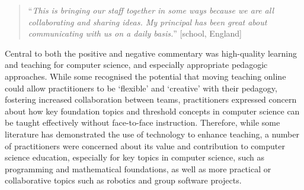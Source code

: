 \documentclass[conference]{IEEEtran}
\begin{document}

\begin{quotation}
``{\emph{This is bringing our staff together in some ways because we
are all collaborating and sharing ideas. My principal has been great
about communicating with us on a daily basis.}}'' [school, England]
\end{quotation}

Central to both the positive and negative commentary was high-quality
learning and teaching for computer science, and especially appropriate
pedagogic approaches. While some recognised the potential that moving
teaching online could allow practitioners to be `flexible' and
`creative' with their pedagogy, fostering increased collaboration between teams,
practitioners expressed concern about
how key foundation topics and threshold concepts in computer science
can be taught effectively without face-to-face instruction. Therefore,
while some literature has demonstrated the use of technology to
enhance teaching, a number of practitioners were concerned about its
value and contribution to computer science education, especially for key topics in
computer science, such as programming and mathematical foundations, as
well as more practical or collaborative topics such as robotics and
group software projects.

\end{document}
